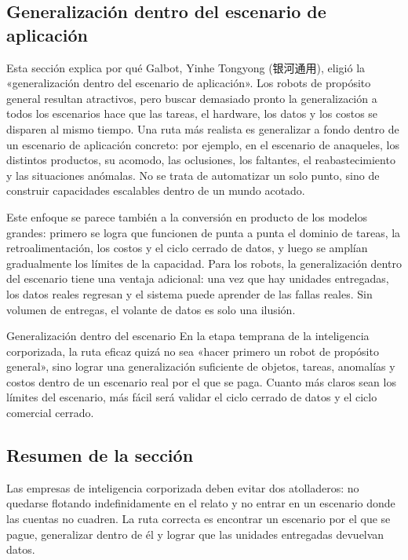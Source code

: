 \subsection{Generalización dentro del escenario de aplicación}

Esta sección explica por qué Galbot, Yinhe Tongyong (银河通用), eligió la «generalización dentro del escenario de aplicación». Los robots de propósito general resultan atractivos, pero buscar demasiado pronto la generalización a todos los escenarios hace que las tareas, el hardware, los datos y los costos se disparen al mismo tiempo. Una ruta más realista es generalizar a fondo dentro de un escenario de aplicación concreto: por ejemplo, en el escenario de anaqueles, los distintos productos, su acomodo, las oclusiones, los faltantes, el reabastecimiento y las situaciones anómalas. No se trata de automatizar un solo punto, sino de construir capacidades escalables dentro de un mundo acotado.

Este enfoque se parece también a la conversión en producto de los modelos grandes: primero se logra que funcionen de punta a punta el dominio de tareas, la retroalimentación, los costos y el ciclo cerrado de datos, y luego se amplían gradualmente los límites de la capacidad. Para los robots, la generalización dentro del escenario tiene una ventaja adicional: una vez que hay unidades entregadas, los datos reales regresan y el sistema puede aprender de las fallas reales. Sin volumen de entregas, el volante de datos es solo una ilusión.

\begin{importantbox}{Generalización dentro del escenario}
En la etapa temprana de la inteligencia corporizada, la ruta eficaz quizá no sea «hacer primero un robot de propósito general», sino lograr una generalización suficiente de objetos, tareas, anomalías y costos dentro de un escenario real por el que se paga. Cuanto más claros sean los límites del escenario, más fácil será validar el ciclo cerrado de datos y el ciclo comercial cerrado.
\end{importantbox}

\subsection{Resumen de la sección}

Las empresas de inteligencia corporizada deben evitar dos atolladeros: no quedarse flotando indefinidamente en el relato y no entrar en un escenario donde las cuentas no cuadren. La ruta correcta es encontrar un escenario por el que se pague, generalizar dentro de él y lograr que las unidades entregadas devuelvan datos.
